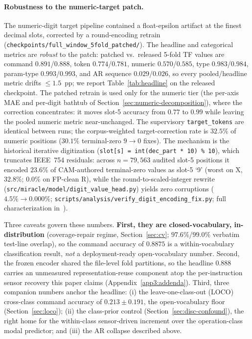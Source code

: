 \documentclass[sensors,article,submit,moreauthors,pdftex]{Definitions/mdpi}
\begin{document}
\paragraph{Robustness to the numeric-target patch.} The numeric-digit target pipeline contained a float-epsilon artifact at the finest decimal slots, corrected by a round-encoding retrain (\texttt{checkpoints/full\_window\_5fold\_patched/}). The headline and categorical metrics are \emph{robust} to the patch: patched vs.\ released 5-fold TF values are command $0.891$/$0.888$, token $0.774$/$0.781$, numeric $0.570$/$0.585$, type $0.983$/$0.984$, param-type $0.993$/$0.993$, and AR sequence $0.029$/$0.026$, so every pooled/headline metric drifts $\le\!1.5$~pp; we report Table~\ref{tab:headline} on the released checkpoint. The patched retrain is used only for the numeric tier (the per-axis MAE and per-digit bathtub of Section~\ref{sec:numeric-decomposition}), where the correction concentrates: it moves slot-5 accuracy from $0.77$ to $0.99$ while leaving the pooled numeric metric near-unchanged. The supervisory \texttt{target\_tokens} are identical between runs; the corpus-weighted target-correction rate is $32.5\%$ of numeric positions ($30.1\%$ terminal-zero $9\!\to\!0$ fixes). The mechanism is the historical iterative digitization (\texttt{slot[s] = int(dec\_part * 10) \% 10}), which truncates IEEE~754 residuals: across $n\!=\!79{,}563$ audited slot-5 positions it encoded $23.6\%$ of CAM-authored terminal-zero values as slot-5 `9' (worst on X, $32.8\%$; $0.0\%$ on FP-clean R), while the round-to-scaled-integer rewrite (\texttt{src/miracle/model/digit\_value\_head.py}) yields zero corruptions ($4.5\%\!\to\!0.000\%$; \texttt{scripts/analysis/verify\_digit\_encoding\_fix.py}; full characterization in~\cite{paperB_entropy}).

Three caveats govern these numbers. \textbf{First, they are closed-vocabulary, in-distribution} (coverage-repair regime, Section~\ref{sec:cv}; $97.6\%$/$99.0\%$ verbatim test-line overlap), so the command accuracy of $0.8875$ is a within-vocabulary classification result, \emph{not} a deployment-ready open-vocabulary number. Second, the frozen encoder shared the file-level fold partitions, so the headline $0.888$ carries an unmeasured representation-reuse component atop the per-instruction sensor recovery this paper claims (Appendix~\ref{app3:addenda}). Third, three companion numbers anchor the headline: (i) the leave-one-class-out (LOCO) cross-class command accuracy of $0.213 \pm 0.191$, the open-vocabulary floor (Section~\ref{sec:loco}); (ii) the class-prior control (Section~\ref{sec:disc-confound}), the right home for the within-class sensor-driven increment over the operation-class modal predictor; and (iii) the AR collapse described above.
\end{document}
